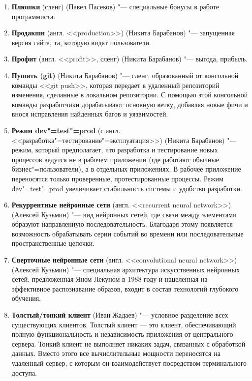 \documentclass[12pt]{article}
\begin{document}
\begin{enumerate}
    \item \textbf{Плюшки} (сленг) (Павел Пасеков) "--- специальные бонусы в работе программиста.

    \item \textbf{Продакшн} (англ. <<production>>) (Никита Барабанов) "--- запущенная версия сайта, та, которую видят пользователи.

    \item \textbf{Профит} (англ. <<profit>>, сленг) (Никита Барабанов) "--- выгода, прибыль.

    \item \textbf{Пушить (git)} (Никита Барабанов) "--- сленг, образованный от консольной команды <<git push>>, которая передает в удаленный репозиторий изменения, сделанные в локальном репозитории. С помощью этой консольной команды разработчики дорабатывают основную ветку, добавляя новые фичи и внося исправления найденных багов и уязвимостей.

    \item \textbf{Режим dev"=test"=prod} (с англ. <<разработка"=тестирование"=эксплуатация>>) (Никита Барабанов) "--- режим, который предполагает, что разработка и тестирование новых процессов ведутся не в рабочем приложении (где работают обычные бизнес"=пользователи), а в отдельных приложениях. В рабочее приложение переносятся только проверенные, протестированные процессы. Режим dev"=test"=prod увеличивает стабильность системы и удобство разработки.
    
    \item \textbf{Рекуррентные нейронные сети} (англ. <<recurrent neural network>>) (Алексей Кузьмин) "--- вид нейронных сетей, где связи между элементами образуют направленную последовательность. Благодаря этому появляется возможность обрабатывать серии событий во времени или последовательные пространственные цепочки.

    \item \textbf{Сверточные нейронные сети}  (англ. <<convolutional neural network>>) (Алексей Кузьмин) "--- специальная архитектура искусственных нейронных сетей, предложенная Яном Лекуном в 1988 году и нацеленная на эффективное распознавание образов, входит в состав технологий глубокого обучения.

    \item \textbf{Толстый/тонкий клиент} (Иван Жадаев) "--- условное разделение всех существующих клиентов. Толстый клиент — это клиент, обеспечивающий полную функциональность и независимость приложения от центрального сервера. Тонкий клиент не выполняет никаких задач, связанных с обработкой данных. Вместо этого все вычислительные мощности переносятся на удаленный сервер, с которым он взаимодействует посредством терминального доступа.


\end{enumerate}
\end{document}
